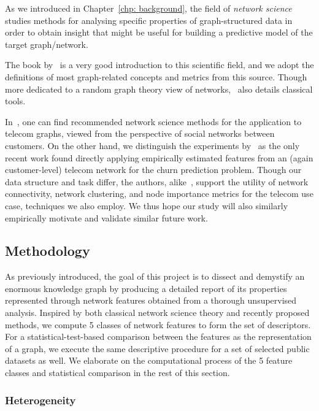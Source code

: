As we introduced in Chapter~\ref{chp: background}, the field of \emph{network science} studies methods for analysing specific properties of graph-structured data in order to obtain insight that might be useful for building a predictive model of the target graph/network. 

The book by~\cite{barabasi_network_2016} is a very good introduction to this scientific field, and we adopt the definitions of most graph-related concepts and metrics from this source. Though more dedicated to a random graph theory view of networks,~\cite{lewis_network_2011} also details classical tools.

In~\cite{pinheiro_social_2011}, one can find recommended network science methods for the application to telecom graphs, viewed from the perspective of social networks between customers. On the other hand, we distinguish the experiments by~\cite{kostic_social_2020} as the only recent work found directly applying empirically estimated features from an (again customer-level) telecom network for the churn prediction problem. Though our data structure and task differ, the authors, alike~\cite{pinheiro_social_2011}, support the utility of network connectivity, network clustering, and node importance metrics for the telecom use case, techniques we also employ. We thus hope our study will also similarly empirically motivate and validate similar future work.

\subsection{Methodology}
\label{sec:methodology_swisscom}

As previously introduced, the goal of this project is to dissect and demystify an enormous knowledge graph by producing a detailed report of its properties represented through network features obtained from a thorough unsupervised analysis. Inspired by both classical network science theory and recently proposed methods, we compute 5 classes of network features to form the set of descriptors. For a statistical-test-based comparison between the features as the representation of a graph, we execute the same descriptive procedure for a set of selected public datasets as well. We elaborate on the computational process of the 5 feature classes and statistical comparison in the rest of this section.

\subsubsection{Heterogeneity}

